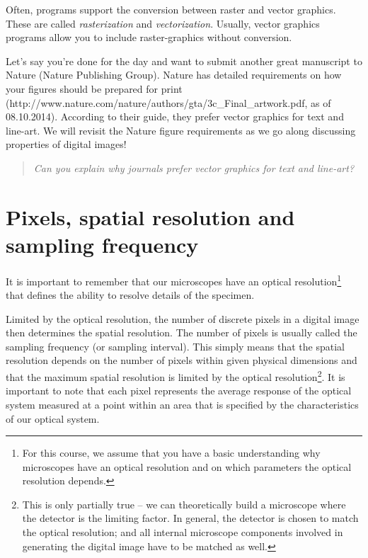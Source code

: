 Often, programs support the conversion between raster and vector graphics. These are called \emph{rasterization} and \emph{vectorization}. Usually, vector graphics programs allow you to include raster-graphics without conversion.

Let's say you're done for the day and want to submit another great manuscript to Nature (Nature Publishing Group). Nature has detailed requirements on how your figures should be prepared for print (http://www.nature.com/nature/authors/gta/3c\_Final\_artwork.pdf, as of 08.10.2014). According to their guide, they prefer vector graphics for text and line-art. We will revisit the Nature figure requirements as we go along discussing properties of digital images!

\begin{verse}
\emph{Can you explain why journals prefer vector graphics for text and line-art?}
\end{verse}

\section{Pixels, spatial resolution and sampling frequency}
\label{sec:mod1-samplingrate}

It is important to remember that our microscopes have an optical resolution\footnote{For this course, we assume that you have a basic understanding why microscopes have an optical resolution and on which parameters the optical resolution depends.} that defines the ability to resolve details of the specimen. 

Limited by the optical resolution, the number of discrete pixels in a digital image then determines the spatial resolution. The number of pixels is usually called the sampling frequency (or sampling interval). This simply means that the spatial resolution depends on the number of pixels within given physical dimensions and that the maximum spatial resolution is limited by the optical resolution\footnote{This is only partially true -- we can theoretically build a microscope where the detector is the limiting factor. In general, the detector is chosen to match the optical resolution; and all internal microscope components involved in generating the digital image have to be matched as well.}. It is important to note that each pixel represents the average response of the optical system measured at a point within an area that is specified by the characteristics of our optical system. 

